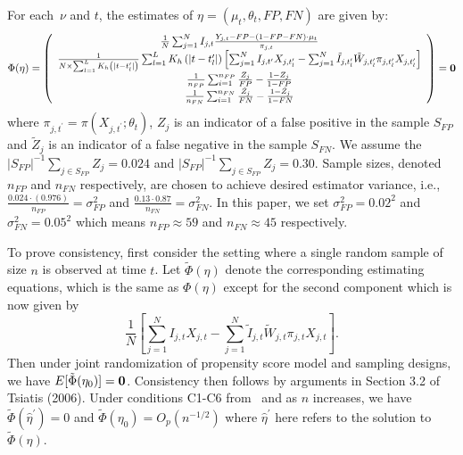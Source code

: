 \documentclass[11pt]{amsart}
\numberwithin{equation}{section}
\theoremstyle{plain}
\begin{document}
For each~$\nu$ and $t$, the estimates of $\eta = (\mu_t, \theta_t, FP, FN)$ are given by:
$$
\Phi (\eta) = \left (
\begin{array}{c}
\frac{1}{N} \sum_{j=1}^N I_{j,t} \frac{Y_{j,t} - FP - (1-FP-FN) \cdot \mu_t}{\pi_{j,t}} \\
\frac{1}{N \times \sum_{l=1}^L K_{h} \left(|t - t_l^\prime| \right)} \sum_{l=1}^L K_{h} \left(|t - t_l^\prime| \right) \left[ \sum_{j=1}^N I_{j,t^\prime} X_{j,t^\prime_l} - \sum_{j = 1}^N \tilde I_{j,t_l^\prime} \tilde W_{j,t_l^\prime}  \pi_{j,t_l^\prime} X_{j,t_l^\prime} \right] \\
\frac{1}{n_{FP}} \sum_{i=1}^{n_{FP}} \frac{Z_j}{FP} - \frac{1-Z_j}{1-FP} \\
\frac{1}{n_{FN}} \sum_{i=1}^{n_{FN}} \frac{\tilde Z_j}{FN} - \frac{1-\tilde Z_j}{1-FN} \\
\end{array}
\right ) = {\bf 0}
$$
where $\pi_{j,t^\prime} = \pi (X_{j,t^\prime}; \theta_t)$, $Z_j$ is an indicator of a false positive in the sample $S_{FP}$  and $\tilde Z_j$ is an indicator of a false negative in the sample $S_{FN}$.  We assume the $|S_{FP}|^{-1} \sum_{j \in S_{FP}} Z_j = 0.024$ and $|S_{FP}|^{-1} \sum_{j \in S_{FP}} Z_j = 0.30$.  Sample sizes, denoted $n_{FP}$ and $n_{FN}$ respectively, are chosen to achieve desired estimator variance, i.e., $\frac{0.024 \cdot (0.976)}{n_{FP}} = \sigma^2_{FP}$ and $\frac{0.13 \cdot 0.87}{n_{FN}} = \sigma^2_{FN}$. In this paper, we set $\sigma^2_{FP} = 0.02^2$ and $\sigma_{FN}^2 = 0.05^2$ which means $n_{FP} \approx 59$ and $n_{FN} \approx 45$ respectively.

To prove consistency, first consider the setting where a single random sample of size $n$ is observed at time $t$.  Let $\tilde \Phi (\eta)$ denote the corresponding estimating equations, which is the same as $\Phi(\eta)$ except for the second component which is now given by
$$
\frac{1}{N} \left[ \sum_{j=1}^N I_{j,t} X_{j,t} - \sum_{j = 1}^N \tilde I_{j,t} \tilde W_{j,t}  \pi_{j,t} X_{j,t} \right].
$$
Then under joint randomization of propensity score model and sampling designs, we have $E [ \tilde \Phi (\eta_0) ] = {\bf 0}$.  Consistency then follows by arguments in Section 3.2 of Tsiatis (2006). Under conditions C1-C6 from~\cite{Chen2019} and as $n$ increases, we have $\tilde \Phi (\hat \eta^\prime) = 0$ and $\tilde \Phi(\eta_0) = O_p ( n^{-1/2} )$ where $\hat \eta^\prime$ here refers to the solution to $\tilde \Phi (\eta)$.
\end{document}
